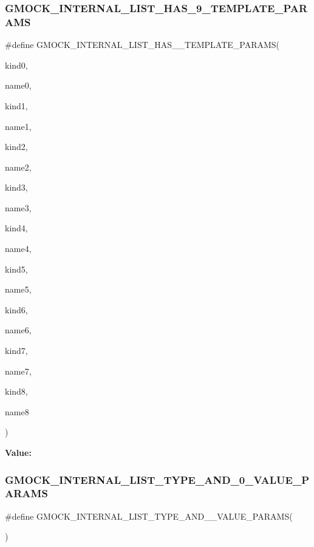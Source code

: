 \subsubsection{\texorpdfstring{GMOCK\_INTERNAL\_LIST\_HAS\_9\_TEMPLATE\_PARAMS}{GMOCK\_INTERNAL\_LIST\_HAS\_9\_TEMPLATE\_PARAMS}}
{\footnotesize\ttfamily \#define G\+M\+O\+C\+K\+\_\+\+I\+N\+T\+E\+R\+N\+A\+L\+\_\+\+L\+I\+S\+T\+\_\+\+H\+A\+S\+\_\+\_\+\+T\+E\+M\+P\+L\+A\+T\+E\+\_\+\+P\+A\+R\+A\+MS(\begin{DoxyParamCaption}\item[{}]{kind0,  }\item[{}]{name0,  }\item[{}]{kind1,  }\item[{}]{name1,  }\item[{}]{kind2,  }\item[{}]{name2,  }\item[{}]{kind3,  }\item[{}]{name3,  }\item[{}]{kind4,  }\item[{}]{name4,  }\item[{}]{kind5,  }\item[{}]{name5,  }\item[{}]{kind6,  }\item[{}]{name6,  }\item[{}]{kind7,  }\item[{}]{name7,  }\item[{}]{kind8,  }\item[{}]{name8 }\end{DoxyParamCaption})}

{\bfseries Value\+:}
\begin{DoxyCode}{0}

\end{DoxyCode}
\mbox{\label{googletest-master_2googlemock_2include_2gmock_2gmock-generated-actions_8h_a76ec2981c2b6c52e3c6cdd1eba7f37ac}} 
\subsubsection{\texorpdfstring{GMOCK\_INTERNAL\_LIST\_TYPE\_AND\_0\_VALUE\_PARAMS}{GMOCK\_INTERNAL\_LIST\_TYPE\_AND\_0\_VALUE\_PARAMS}}
{\footnotesize\ttfamily \#define G\+M\+O\+C\+K\+\_\+\+I\+N\+T\+E\+R\+N\+A\+L\+\_\+\+L\+I\+S\+T\+\_\+\+T\+Y\+P\+E\+\_\+\+A\+N\+D\+\_\+\_\+\+V\+A\+L\+U\+E\+\_\+\+P\+A\+R\+A\+MS(\begin{DoxyParamCaption}{ }\end{DoxyParamCaption})}

